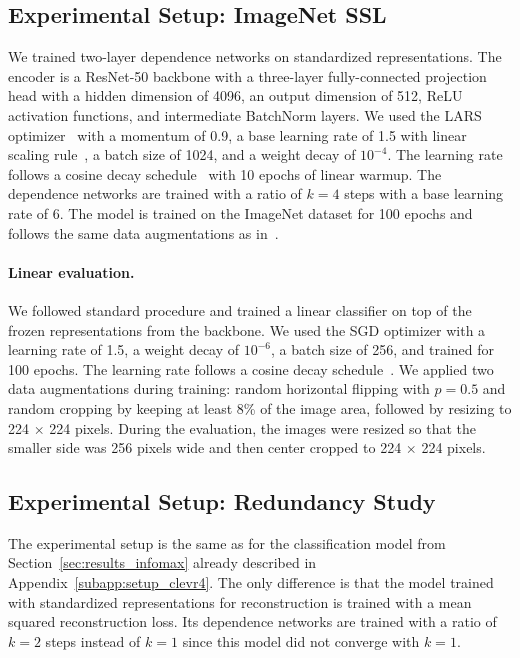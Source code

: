 \subsection{Experimental Setup: ImageNet SSL} \label{subapp:setup_imagenet_ssl}

We trained two-layer dependence networks on standardized representations. The encoder is a ResNet-50 backbone with a three-layer fully-connected projection head with a hidden dimension of 4096, an output dimension of 512, ReLU activation functions, and intermediate BatchNorm layers. 
We used the LARS optimizer~\citep{you2017LARS} with a momentum of 0.9, a base learning rate of 1.5 with linear scaling rule~\citep{goyal2017lr_scaling_rule}, a batch size of 1024, and a weight decay of $10^{-4}$. 
The learning rate follows a cosine decay schedule~\citep{loshchilov2016sgdr} with 10 epochs of linear warmup. The dependence networks are trained with a ratio of $k=4$ steps with a base learning rate of 6. 
The model is trained on the ImageNet dataset for 100 epochs and follows the same data augmentations as in~\cite{grill2020BYOL_ssl}. 

\paragraph{Linear evaluation.} We followed standard procedure and trained a linear classifier on top of the frozen representations from the backbone. We used the SGD optimizer with a learning rate of 1.5, a weight decay of $10^{-6}$, a batch size of 256, and trained for 100 epochs. The learning rate follows a cosine decay schedule~\citep{loshchilov2016sgdr}. 
We applied two data augmentations during training: random horizontal flipping with $p=0.5$ and random cropping by keeping at least 8\% of the image area, followed by resizing to 224 $\times$ 224 pixels. 
During the evaluation, the images were resized so that the smaller side was 256 pixels wide and then center cropped to 224 $\times$ 224 pixels.


\subsection{Experimental Setup: Redundancy Study} \label{subapp:setup_loss_study}

The experimental setup is the same as for the classification model from Section~\ref{sec:results_infomax} already described in Appendix~\ref{subapp:setup_clevr4}. The only difference is that the model trained with standardized representations for reconstruction is trained with a mean squared reconstruction loss. Its dependence networks are trained with a ratio of $k=2$ steps instead of $k=1$ since this model did not converge with $k=1$. 


